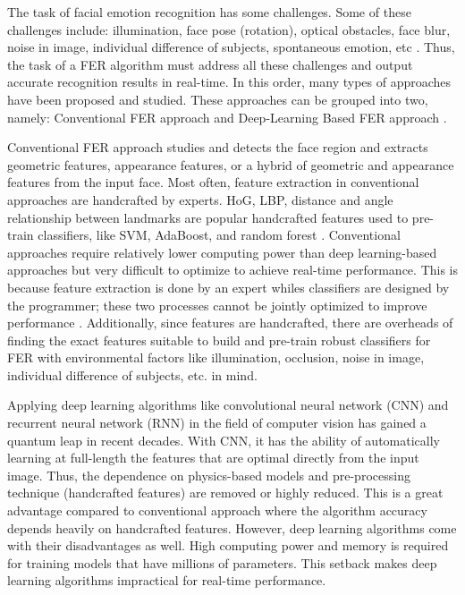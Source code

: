 \documentclass[master]{thesis-uestc}
\begin{document}
The task of facial emotion recognition has some challenges. Some of these challenges include: illumination, face pose (rotation), optical obstacles, face blur, noise in image, individual difference of subjects, spontaneous emotion, etc \cite{Ivanovsky-2017}\cite{josh2018}. Thus, the task of a FER algorithm must address all these challenges and output accurate recognition results in real-time. In this order, many types of approaches have been proposed and studied. These approaches can be grouped into two, namely: Conventional FER approach and Deep-Learning Based FER approach \cite{Ivanovsky-2017}.

Conventional FER approach studies and detects the face region and extracts geometric features, appearance features, or a hybrid of geometric and appearance features from the input face. Most often, feature extraction in conventional approaches are handcrafted by experts. HoG, LBP, distance and angle relationship between landmarks are popular handcrafted features used to pre-train classifiers, like SVM, AdaBoost, and random forest \cite{Ivanovsky-2017}. Conventional approaches require relatively lower computing power than deep learning-based approaches but very difficult to optimize to achieve real-time performance. This is because feature extraction is done by an expert whiles classifiers are designed by the programmer; these two processes cannot be jointly optimized to improve performance \cite{Ivanovsky-2017}. Additionally, since features are handcrafted, there are overheads of finding the exact features suitable to build and pre-train robust classifiers for FER with environmental factors like illumination, occlusion, noise in image, individual difference of subjects, etc. in mind.

Applying deep learning algorithms like convolutional neural network (CNN) and recurrent neural network (RNN) in the field of computer vision has gained a quantum leap in recent decades. With CNN, it has the ability of automatically learning at full-length the features that are optimal directly from the input image. Thus, the dependence on physics-based models and pre-processing technique (handcrafted features) are removed or highly reduced. This is a great advantage compared to conventional approach where the algorithm accuracy depends heavily on handcrafted features. However, deep learning algorithms come with their disadvantages as well. High computing power and memory is required for training models that have millions of parameters. This setback makes deep learning algorithms impractical for real-time performance.
\end{document}
